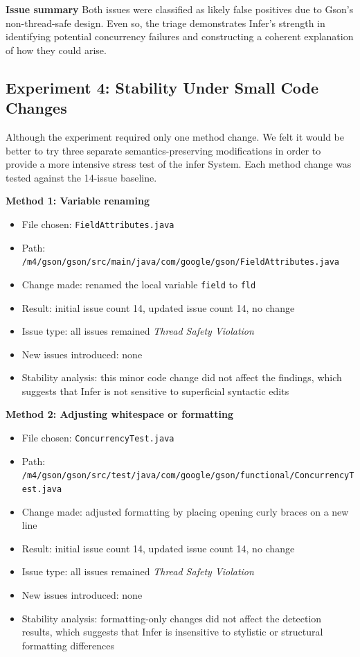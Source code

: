 \documentclass[11pt]{article}
\begin{document}
\textbf{Issue summary} Both issues were classified as likely false positives due to Gson's non-thread-safe design. Even so, the triage demonstrates Infer's strength in identifying potential concurrency failures and constructing a coherent explanation of how they could arise.

\subsection{Experiment 4: Stability Under Small Code Changes}
Although the experiment required only one method change. We felt it would be better
to try three separate semantics-preserving modifications in order to provide a more intensive stress test 
of the infer System. Each method change was tested against the 14-issue baseline.

\textbf{Method 1: Variable renaming}
\begin{itemize}
\item File chosen: \texttt{FieldAttributes.java}
\item Path: \texttt{/m4/gson/gson/src/main/java/com/google/gson/FieldAttributes.java}
\item Change made: renamed the local variable \texttt{field} to \texttt{fld}
\item Result: initial issue count 14, updated issue count 14, no change
\item Issue type: all issues remained \textit{Thread Safety Violation}
\item New issues introduced: none
\item Stability analysis: this minor code change did not affect the findings, which suggests that Infer is not sensitive to superficial syntactic edits
\end{itemize}

\textbf{Method 2: Adjusting whitespace or formatting}
\begin{itemize}
\item File chosen: \texttt{ConcurrencyTest.java}
\item Path: \texttt{/m4/gson/gson/src/test/java/com/google/gson/functional/ConcurrencyTest.java}
\item Change made: adjusted formatting by placing opening curly braces on a new line
\item Result: initial issue count 14, updated issue count 14, no change
\item Issue type: all issues remained \textit{Thread Safety Violation}
\item New issues introduced: none
\item Stability analysis: formatting-only changes did not affect the detection results, which suggests that Infer is insensitive to stylistic or structural formatting differences
\end{itemize}
\end{document}
